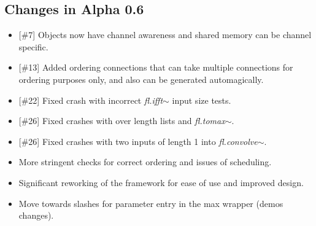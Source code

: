 \documentclass{article}
\newcommand{\flobject}[1]{\textit{fl.#1$\sim$}}
\begin{document}
\subsection{Changes in Alpha 0.6}
\vspace{0.1in}

\begin{itemize}
\item {[\#7]} Objects now have channel awareness and shared memory can be channel specific.
\item {[\#13]} Added ordering connections that can take multiple connections for ordering purposes only, and also can be generated automagically.
\item {[\#22]} Fixed crash with incorrect \flobject{ifft} input size tests.
\item {[\#26]} Fixed crashes with over length lists and \flobject{tomax}.
\item {[\#26]} Fixed crashes with two inputs of length 1 into \flobject{convolve}.
\item More stringent checks for correct ordering and issues of scheduling.
\item Significant reworking of the framework for ease of use and improved design.
\item Move towards slashes for parameter entry in the max wrapper (demos changes).
\end{itemize}
\end{document}
